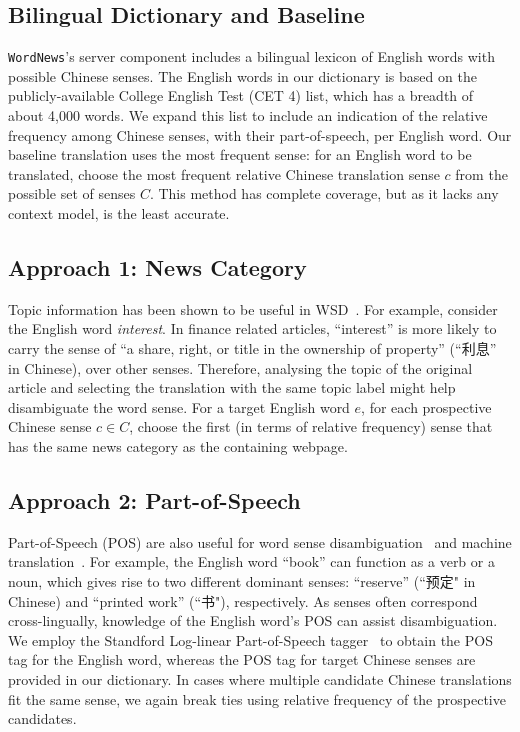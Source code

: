 \begin{CJK}{UTF8}{gbsn}
\subsection{Bilingual Dictionary and Baseline}
{\tt WordNews}'s server component includes a bilingual lexicon of
English words with possible Chinese senses. The English words in our 
dictionary is based on the publicly-available College
English Test (CET 4) list, which has a breadth of about 4,000 words.
We expand this list to include an indication of the relative frequency among Chinese senses, with their part-of-speech, per English word.
Our baseline translation uses the most frequent sense: for an English
word to be translated, choose the most frequent relative Chinese
translation sense $c$ from the possible set of senses $C$. This method
has complete coverage, but as it lacks any context model, is the least
accurate.

\subsection{Approach 1: News Category}
Topic information has been shown to be useful in
WSD~\cite{Boyd-Graber2007}.  For example, consider the English word
\textit{interest}. In finance related articles, ``interest'' is more
likely to carry the sense of ``a share, right, or title in the
ownership of property'' (``利息'' in Chinese), over other senses.
Therefore, analysing the topic of the original article and selecting
the translation with the same topic label might help disambiguate the
word sense. For a target English word $e$, for each prospective Chinese
sense $c \in C$, choose the first (in terms of relative frequency)
sense that has the same news category as the containing webpage.

\subsection{Approach 2: Part-of-Speech}
Part-of-Speech (POS) are also useful for word sense
disambiguation~\cite{Wilks1998} and machine
translation~\cite{Toutanova2002,Ueffing2003}.  For example, the
English word ``book'' can function as a verb or a noun, which gives
rise to two different dominant senses: ``reserve'' (``预定" in
Chinese) and ``printed work'' (``书"), respectively. As senses often
correspond cross-lingually, knowledge of the English word's POS can
assist disambiguation.  We employ the Standford Log-linear
Part-of-Speech tagger~\cite{Toutanova2003} to obtain the POS tag for
the English word, whereas the POS tag for target Chinese senses are
provided in our dictionary.  In cases where multiple candidate Chinese
translations fit the same sense, we again break ties using relative
frequency of the prospective candidates.


\end{CJK}
